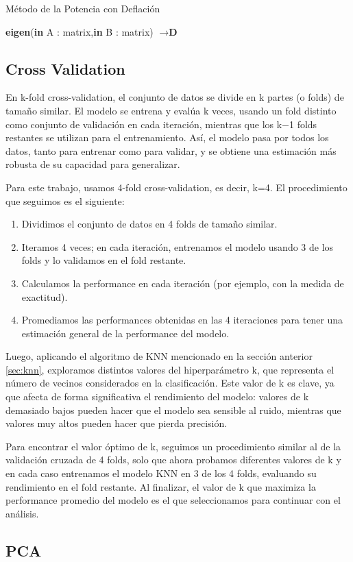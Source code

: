 \begin{algorithm}
\caption{Método de la Potencia con Deflación}\label{def_algo}
\begin{algorithmic}
\State \textbf{eigen}(\textbf{in} A : matrix,\textbf{in} B : matrix) $\to \textbf{D}$

\end{algorithmic}
\end{algorithm}

\subsection{Cross Validation}
En k-fold cross-validation, el conjunto de datos se divide en k partes (o folds) de tamaño similar. El modelo se entrena y evalúa k veces, usando un fold distinto como conjunto de validación en cada iteración, mientras que los k−1 folds restantes se utilizan para el entrenamiento. Así, el modelo pasa por todos los datos, tanto para entrenar como para validar, y se obtiene una estimación más robusta de su capacidad para generalizar.

Para este trabajo, usamos 4-fold cross-validation, es decir, k=4. El procedimiento que seguimos es el siguiente:

\begin{enumerate}
    \item Dividimos el conjunto de datos en 4 folds de tamaño similar. 
    \item Iteramos 4 veces; en cada iteración, entrenamos el modelo usando 3 de los folds y lo validamos en el fold restante.
    \item Calculamos la performance en cada iteración (por ejemplo, con la medida de exactitud). 
    \item Promediamos las performances obtenidas en las 4 iteraciones para tener una estimación general de la performance del modelo. 
\end{enumerate}

Luego, aplicando el algoritmo de KNN mencionado en la sección anterior \ref{sec:knn}, exploramos distintos valores del hiperparámetro k, que representa el número de vecinos considerados en la clasificación. Este valor de k es clave, ya que afecta de forma significativa el rendimiento del modelo: valores de k demasiado bajos pueden hacer que el modelo sea sensible al ruido, mientras que valores muy altos pueden hacer que pierda precisión.

Para encontrar el valor óptimo de k, seguimos un procedimiento similar al de la validación cruzada de 4 folds, solo que ahora probamos diferentes valores de k y en cada caso entrenamos el modelo KNN en 3 de los 4 folds, evaluando su rendimiento en el fold restante. Al finalizar, el valor de k que maximiza la performance promedio del modelo es el que seleccionamos para continuar con el análisis.

\subsection{PCA}




